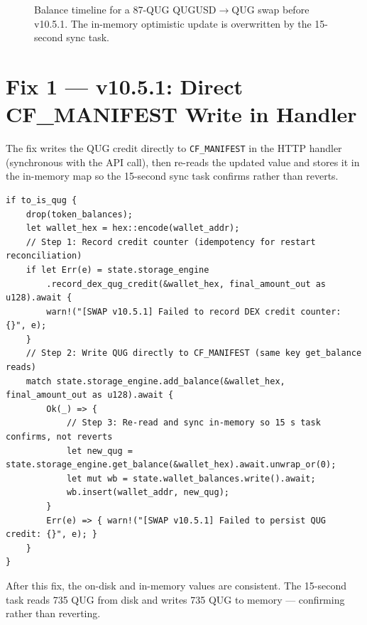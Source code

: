 \documentclass[11pt,a4paper]{article}
\begin{document}
\begin{figure}[H]
\caption{Balance timeline for a 87-QUG QUGUSD$\to$QUG swap before v10.5.1. The
  in-memory optimistic update is overwritten by the 15-second sync task.}
\label{fig:timeline1}
\end{figure}

\section{Fix 1 — v10.5.1: Direct CF\_MANIFEST Write in Handler}

The fix writes the QUG credit directly to \texttt{CF\_MANIFEST} in the HTTP
handler (synchronous with the API call), then re-reads the updated value and
stores it in the in-memory map so the 15-second sync task confirms rather than
reverts.

\begin{lstlisting}[caption={v10.5.1 handler fix — \texttt{crates/q-api-server/src/handlers.rs}},
                   label={lst:v10501}]
if to_is_qug {
    drop(token_balances);
    let wallet_hex = hex::encode(wallet_addr);
    // Step 1: Record credit counter (idempotency for restart reconciliation)
    if let Err(e) = state.storage_engine
        .record_dex_qug_credit(&wallet_hex, final_amount_out as u128).await {
        warn!("[SWAP v10.5.1] Failed to record DEX credit counter: {}", e);
    }
    // Step 2: Write QUG directly to CF_MANIFEST (same key get_balance reads)
    match state.storage_engine.add_balance(&wallet_hex, final_amount_out as u128).await {
        Ok(_) => {
            // Step 3: Re-read and sync in-memory so 15 s task confirms, not reverts
            let new_qug = state.storage_engine.get_balance(&wallet_hex).await.unwrap_or(0);
            let mut wb = state.wallet_balances.write().await;
            wb.insert(wallet_addr, new_qug);
        }
        Err(e) => { warn!("[SWAP v10.5.1] Failed to persist QUG credit: {}", e); }
    }
}
\end{lstlisting}

After this fix, the on-disk and in-memory values are consistent.  The
15-second task reads 735 QUG from disk and writes 735 QUG to memory —
confirming rather than reverting.
\end{document}
